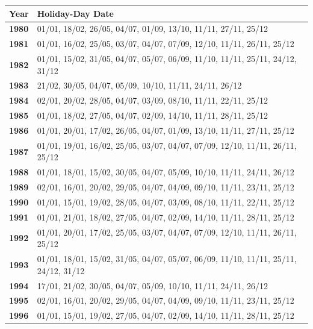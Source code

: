 \documentclass[11pt, english]{article}
\begin{document}
		\begin{table}[h]
			\tiny
			\renewcommand{\arraystretch}{1.25}
		\begin{center}
		\begin{tabular}{p{1cm}p{12cm}}
			\textbf{Year} & \textbf{Holiday-Day Date}\\
			\hline
			\textbf{1980} & 01/01, 18/02, 26/05, 04/07, 01/09, 13/10, 11/11, 27/11, 25/12\\
			\textbf{1981} & 01/01, 16/02, 25/05, 03/07, 04/07, 07/09, 12/10, 11/11, 26/11, 25/12\\
			\textbf{1982} & 01/01, 15/02, 31/05, 04/07, 05/07, 06/09, 11/10, 11/11, 25/11, 24/12, 31/12\\
			\textbf{1983} & 21/02, 30/05, 04/07, 05/09, 10/10, 11/11, 24/11, 26/12\\
			\textbf{1984} & 02/01, 20/02, 28/05, 04/07, 03/09, 08/10, 11/11, 22/11, 25/12\\
			\textbf{1985} & 01/01, 18/02, 27/05, 04/07, 02/09, 14/10, 11/11, 28/11, 25/12\\
			\textbf{1986} & 01/01, 20/01, 17/02, 26/05, 04/07, 01/09, 13/10, 11/11, 27/11, 25/12\\
			\textbf{1987} & 01/01, 19/01, 16/02, 25/05, 03/07, 04/07, 07/09, 12/10, 11/11, 26/11, 25/12\\    
                        \textbf{1988} & 01/01, 18/01, 15/02, 30/05, 04/07, 05/09, 10/10, 11/11, 24/11, 26/12\\
                        \textbf{1989} & 02/01, 16/01, 20/02, 29/05, 04/07, 04/09, 09/10, 11/11, 23/11, 25/12\\
                        \textbf{1990} & 01/01, 15/01, 19/02, 28/05, 04/07, 03/09, 08/10, 11/11, 22/11, 25/12\\
                        \textbf{1991} & 01/01, 21/01, 18/02, 27/05, 04/07, 02/09, 14/10, 11/11, 28/11, 25/12\\
                        \textbf{1992} & 01/01, 20/01, 17/02, 25/05, 03/07, 04/07, 07/09, 12/10, 11/11, 26/11, 25/12\\
			\textbf{1993} & 01/01, 18/01, 15/02, 31/05, 04/07, 05/07, 06/09, 11/10, 11/11, 25/11, 24/12, 31/12\\    
                        \textbf{1994} & 17/01, 21/02, 30/05, 04/07, 05/09, 10/10, 11/11, 24/11, 26/12\\
                        \textbf{1995} & 02/01, 16/01, 20/02, 29/05, 04/07, 04/09, 09/10, 11/11, 23/11, 25/12\\
                        \textbf{1996} & 01/01, 15/01, 19/02, 27/05, 04/07, 02/09, 14/10, 11/11, 28/11, 25/12\\

\end{tabular}
\end{center}
\end{table}
\end{document}
